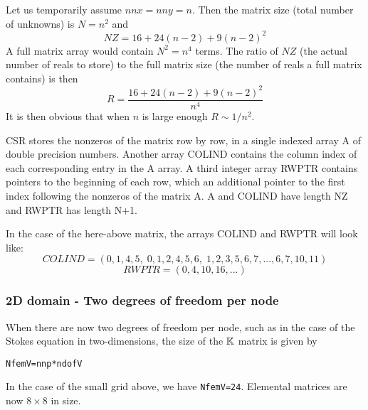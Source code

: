 Let us temporarily assume $nnx=nny=n$. Then the matrix size (total
number of unknowns) is $N=n^2$ and  
\[
NZ=16+24(n-2)+9(n-2)^2
\]
A full matrix array would contain $N^2=n^4$ terms. 
The ratio of $NZ$ (the actual number of reals to store)
to the full matrix size (the number of reals a full matrix contains) is then 
\[
R = \frac{16+24(n-2)+9(n-2)^2}{n^4}
\]
It is then obvious that when $n$ is large enough $R \sim 1/n^2$.

CSR stores the nonzeros of the matrix row by row, in a
single indexed array A of double precision  numbers.
Another array COLIND contains the column index of each
corresponding entry in the A array. A third integer array RWPTR
contains pointers to the beginning of each row, which an additional pointer to
the first index following the nonzeros of the matrix A.
A and COLIND have length NZ and RWPTR has length N+1.

In the case of the here-above matrix, the arrays COLIND and RWPTR will look like:
\[
COLIND=(0,1,4,5, \; 0,1,2,4,5,6, \; 1,2,3,5,6,7, ..., 6,7,10,11)
\]
\[
RWPTR=(0,4,10,16, ... )
\]

\subsubsection{2D domain - Two degrees of freedom per node}

When there are now two degrees of freedom per node, such as in the case of the Stokes equation
in two-dimensions, the size of the ${\mathbb{K}}$ matrix is given by 
\begin{lstlisting}
NfemV=nnp*ndofV  
\end{lstlisting}
In the case of the small grid above, we have {\tt NfemV=24}.
Elemental matrices are now $8\times8$ in size.

